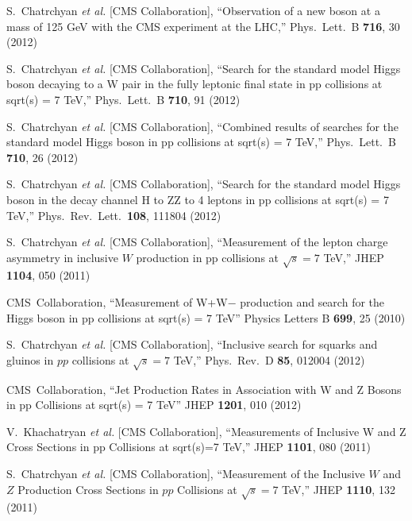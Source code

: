   S.~Chatrchyan {\it et al.}  [CMS Collaboration],
  ``Observation of a new boson at a mass of 125 GeV with the CMS experiment at the LHC,''
  Phys.\ Lett.\ B {\bf 716}, 30 (2012)

  S.~Chatrchyan {\it et al.}  [CMS Collaboration],
  ``Search for the standard model Higgs boson decaying to a W pair in the fully leptonic final state in pp collisions at sqrt(s) = 7 TeV,''
  Phys.\ Lett.\ B {\bf 710}, 91 (2012)

  S.~Chatrchyan {\it et al.}  [CMS Collaboration],
  ``Combined results of searches for the standard model Higgs boson in pp collisions at sqrt(s) = 7 TeV,''
  Phys.\ Lett.\ B {\bf 710}, 26 (2012)

  S.~Chatrchyan {\it et al.}  [CMS Collaboration],
  ``Search for the standard model Higgs boson in the decay channel H to ZZ to 4 leptons in pp collisions at sqrt(s) = 7 TeV,''
  Phys.\ Rev.\ Lett.\  {\bf 108}, 111804 (2012)

  S.~Chatrchyan {\it et al.} [CMS Collaboration],
  ``Measurement of the lepton charge asymmetry in inclusive $W$ production in pp collisions at $\sqrt{s} = 7$ TeV,''
  JHEP {\bf 1104}, 050 (2011)

  CMS~Collaboration,
  ``Measurement of W+W− production and search for the Higgs boson in pp collisions at sqrt(s) = 7 TeV''
  Physics Letters B {\bf 699}, 25 (2010)

  S.~Chatrchyan {\it et al.}  [CMS Collaboration],
  ``Inclusive search for squarks and gluinos in $pp$ collisions at $\sqrt{s}=7$ TeV,''
  Phys.\ Rev.\ D {\bf 85}, 012004 (2012)

  CMS~Collaboration,
  ``Jet Production Rates in Association with W and Z Bosons in pp Collisions at sqrt(s) = 7 TeV''
  JHEP {\bf 1201}, 010 (2012)

  V.~Khachatryan {\it et al.}  [CMS Collaboration],
  ``Measurements of Inclusive W and Z Cross Sections in pp Collisions at sqrt(s)=7 TeV,''
  JHEP {\bf 1101}, 080 (2011)

  S.~Chatrchyan {\it et al.} [CMS Collaboration],
  ``Measurement of the Inclusive $W$ and $Z$ Production Cross Sections in $pp$ Collisions at $\sqrt{s}=7$ TeV,''
  JHEP {\bf 1110}, 132 (2011)



